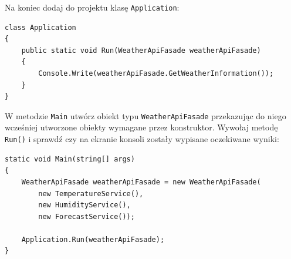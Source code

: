 Na koniec dodaj do projektu klasę \texttt{Application}:
\begin{lstlisting}	
class Application
{
	public static void Run(WeatherApiFasade weatherApiFasade)
	{
		Console.Write(weatherApiFasade.GetWeatherInformation());
	}
}
\end{lstlisting}
W metodzie \texttt{Main} utwórz obiekt typu \texttt{WeatherApiFasade} przekazując do niego wcześniej utworzone obiekty wymagane przez konstruktor. Wywołaj metodę \texttt{Run()} i sprawdź czy na ekranie konsoli zostały wypisane oczekiwane wyniki:
\begin{lstlisting}	
static void Main(string[] args)
{
	WeatherApiFasade weatherApiFasade = new WeatherApiFasade(
		new TemperatureService(), 
		new HumidityService(),
		new ForecastService());
	
	Application.Run(weatherApiFasade);
}
\end{lstlisting}
